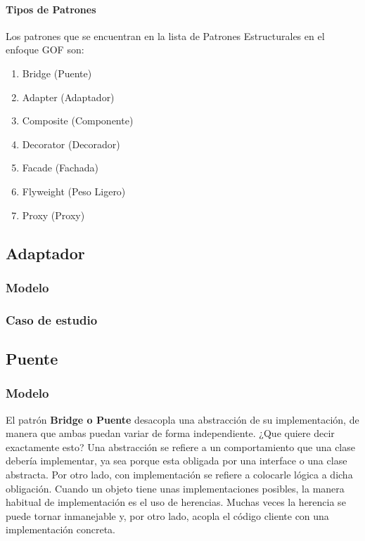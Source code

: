 \paragraph{Tipos de Patrones}
Los patrones que se encuentran en la lista de Patrones Estructurales en el enfoque GOF son:
\begin{enumerate}
	\item Bridge (Puente)
	\item Adapter (Adaptador)
	\item Composite (Componente)
	\item Decorator (Decorador)
	\item Facade (Fachada)
	\item Flyweight (Peso Ligero) 
	\item Proxy (Proxy)
\end{enumerate}

\subsection{Adaptador}
\subsubsection{Modelo}
\newpage
\subsubsection{Caso de estudio}
\newpage


\subsection{Puente}
	
\subsubsection{Modelo}

El patrón \textbf{Bridge o Puente} desacopla una abstracción de su implementación, de manera que ambas puedan variar de forma independiente. ¿Que quiere decir exactamente esto? Una abstracción se refiere a un comportamiento que una clase debería implementar, ya sea porque esta obligada por una interface o una clase abstracta. Por otro lado, con implementación se refiere a colocarle lógica a dicha obligación. Cuando un objeto tiene unas implementaciones posibles, la manera habitual de implementación es el uso de herencias. Muchas veces la herencia se puede tornar inmanejable y, por otro lado, acopla el código cliente con una implementación concreta. 

